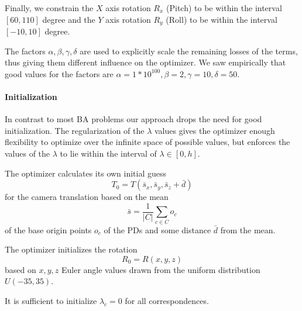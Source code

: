 Finally, we constrain the $X$ axis rotation $R_x$ (Pitch) to be within the interval $[60, 110]$ degree and the $Y$ axis rotation $R_y$ (Roll) to be within the interval $[-10, 10]$ degree.

The factors $\alpha, \beta, \gamma, \delta$ are used to explicitly scale the remaining losses of the terms, thus giving them different influence on the optimizer. 
We saw empirically that good values for the factors are $\alpha = 1*10^{100}, \beta = 2, \gamma = 10, \delta = 50$.

\paragraph{Initialization}
In contrast to most BA problems our approach drops the need for good initialization. 
The regularization of the $\lambda$ values gives the optimizer enough flexibility to optimize over the infinite space of possible values, but enforces the values of the $\lambda$ to lie within the interval of $\lambda \in [0, h]$.

The optimizer calculates its own initial guess
\begin{equation}
  T_0 = T(\bar{s}_x, \bar{s}_y, \bar{s}_z + \bar{d}) 
\end{equation}
for the camera translation based on the mean 
\begin{equation}
  \bar{s} = \frac{1}{\left\lvert C \right\rvert } \sum_{c \in C} o_c
\end{equation}
of the base origin points $o_c$ of the PDs and some distance $\bar{d}$ from the mean.

The optimizer initializes the rotation  
\begin{equation}
  R_0 = R(x, y, z)
\end{equation}
based on $x, y, z$ Euler angle values drawn from the uniform distribution $U(-35, 35)$.

It is sufficient to initialize $\lambda_c = 0$ for all correspondences.